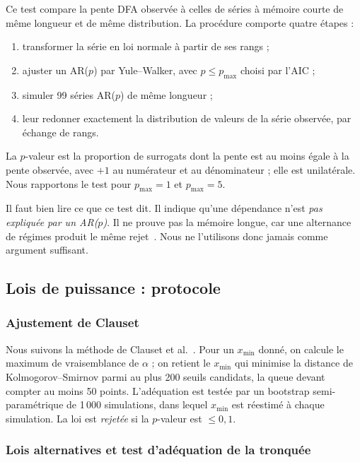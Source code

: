 \documentclass[11pt,a4paper]{article}
\renewcommand{\_}{\textunderscore\penalty0\hspace{0pt}}
\begin{document}
Ce test compare la pente DFA observée à celles de séries à mémoire courte de même longueur
et de même distribution. La procédure comporte quatre étapes :
\begin{enumerate}
  \item transformer la série en loi normale à partir de ses rangs ;
  \item ajuster un AR($p$) par Yule--Walker, avec $p\le p_{\max}$ choisi par l'AIC ;
  \item simuler 99 séries AR($p$) de même longueur ;
  \item leur redonner exactement la distribution de valeurs de la série observée, par
  échange de rangs.
\end{enumerate}
La $p$-valeur est la proportion de surrogats dont la pente est au moins égale à la pente
observée, avec $+1$ au numérateur et au dénominateur ; elle est unilatérale. Nous rapportons
le test pour $p_{\max}=1$ et $p_{\max}=5$.

Il faut bien lire ce que ce test dit. Il indique qu'une dépendance n'est \emph{pas expliquée
par un AR($p$)}. Il ne prouve pas la mémoire longue, car une alternance de régimes produit
le même rejet~\cite{diebold2001}. Nous ne l'utilisons donc jamais comme argument suffisant.

\subsection{Lois de puissance : protocole}
\label{sec:lp-methode}

\subsubsection{Ajustement de Clauset}

Nous suivons la méthode de Clauset et al.~\cite{clauset2009}. Pour un $x_{\min}$ donné, on
calcule le maximum de vraisemblance de $\alpha$ ; on retient le $x_{\min}$ qui minimise la
distance de Kolmogorov--Smirnov parmi au plus 200 seuils candidats, la queue devant compter
au moins 50 points. L'adéquation est testée par un bootstrap semi-paramétrique de
1\,000 simulations, dans lequel $x_{\min}$ est réestimé à chaque simulation. La loi est
\emph{rejetée} si la $p$-valeur est $\le 0{,}1$.

\subsubsection{Lois alternatives et test d'adéquation de la tronquée}
\end{document}
